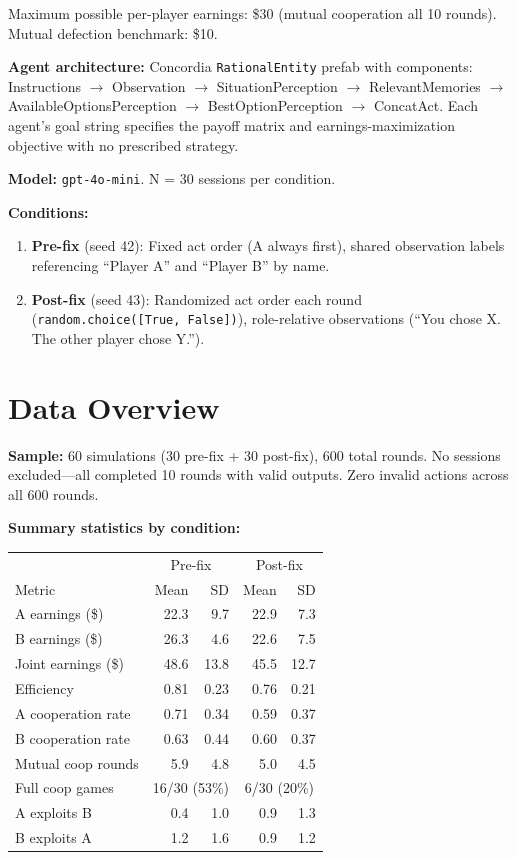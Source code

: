 \documentclass[11pt]{article}
\begin{document}
Maximum possible per-player earnings: \$30 (mutual cooperation all 10 rounds). Mutual defection benchmark: \$10.

\textbf{Agent architecture:} Concordia \texttt{RationalEntity} prefab with components: Instructions $\to$ Observation $\to$ SituationPerception $\to$ RelevantMemories $\to$ AvailableOptionsPerception $\to$ BestOptionPerception $\to$ ConcatAct. Each agent's goal string specifies the payoff matrix and earnings-maximization objective with no prescribed strategy.

\textbf{Model:} \texttt{gpt-4o-mini}. N = 30 sessions per condition.

\textbf{Conditions:}
\begin{enumerate}
\item \textbf{Pre-fix} (seed 42): Fixed act order (A always first), shared observation labels referencing ``Player A'' and ``Player B'' by name.
\item \textbf{Post-fix} (seed 43): Randomized act order each round (\texttt{random.choice([True, False])}), role-relative observations (``You chose X. The other player chose Y.'').
\end{enumerate}

\section*{Data Overview}

\textbf{Sample:} 60 simulations (30 pre-fix + 30 post-fix), 600 total rounds. No sessions excluded---all completed 10 rounds with valid outputs. Zero invalid actions across all 600 rounds.

\textbf{Summary statistics by condition:}

\begin{center}
\begin{tabular}{l rr rr}
\toprule
 & \multicolumn{2}{c}{Pre-fix} & \multicolumn{2}{c}{Post-fix} \\
Metric & Mean & SD & Mean & SD \\
\midrule
A earnings (\$) & 22.3 & 9.7 & 22.9 & 7.3 \\
B earnings (\$) & 26.3 & 4.6 & 22.6 & 7.5 \\
Joint earnings (\$) & 48.6 & 13.8 & 45.5 & 12.7 \\
Efficiency & 0.81 & 0.23 & 0.76 & 0.21 \\
A cooperation rate & 0.71 & 0.34 & 0.59 & 0.37 \\
B cooperation rate & 0.63 & 0.44 & 0.60 & 0.37 \\
Mutual coop rounds & 5.9 & 4.8 & 5.0 & 4.5 \\
Full coop games & \multicolumn{2}{c}{16/30 (53\%)} & \multicolumn{2}{c}{6/30 (20\%)} \\
A exploits B & 0.4 & 1.0 & 0.9 & 1.3 \\
B exploits A & 1.2 & 1.6 & 0.9 & 1.2 \\
\bottomrule
\end{tabular}
\end{center}
\end{document}
